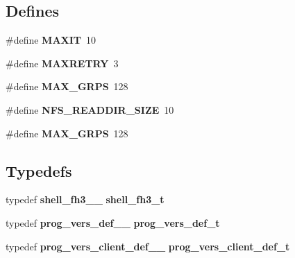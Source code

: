 \subsection*{Defines}
\begin{CompactItemize}
\item 
\#define {\bf MAXIT}\ 10
\item 
\#define {\bf MAXRETRY}\ 3
\item 
\#define {\bf MAX\_\-GRPS}\ 128
\item 
\#define {\bf NFS\_\-READDIR\_\-SIZE}\ 10
\item 
\#define {\bf MAX\_\-GRPS}\ 128
\end{CompactItemize}
\subsection*{Typedefs}
\begin{CompactItemize}
\item 
typedef {\bf shell\_\-fh3\_\-\_\-} {\bf shell\_\-fh3\_\-t}
\item 
typedef {\bf prog\_\-vers\_\-def\_\-\_\-} {\bf prog\_\-vers\_\-def\_\-t}
\item 
typedef {\bf prog\_\-vers\_\-client\_\-def\_\-\_\-} {\bf prog\_\-vers\_\-client\_\-def\_\-t}
\end{CompactItemize}
